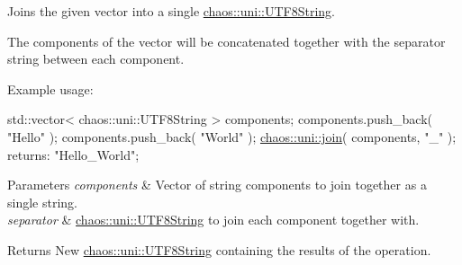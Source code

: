 Joins the given vector into a single \hyperlink{classchaos_1_1uni_1_1_u_t_f8_string}{chaos\-::uni\-::\-U\-T\-F8\-String}. 

The components of the vector will be concatenated together with the separator string between each component.

Example usage\-:


\begin{DoxyCode}
std::vector< chaos::uni::UTF8String > components;
components.push\_back( \textcolor{stringliteral}{"Hello"} );
components.push\_back( \textcolor{stringliteral}{"World"} );
\hyperlink{namespacechaos_1_1uni_ad2a77983423c8b10e2b18cae6f35d329}{chaos::uni::join}( components, \textcolor{stringliteral}{"\_"} ); returns: \textcolor{stringliteral}{"Hello\_World"};
\end{DoxyCode}



\begin{DoxyParams}{Parameters}
{\em components} & Vector of string components to join together as a single string. \\
\hline
{\em separator} & \hyperlink{classchaos_1_1uni_1_1_u_t_f8_string}{chaos\-::uni\-::\-U\-T\-F8\-String} to join each component together with. \\
\hline
\end{DoxyParams}
\begin{DoxyReturn}{Returns}
New \hyperlink{classchaos_1_1uni_1_1_u_t_f8_string}{chaos\-::uni\-::\-U\-T\-F8\-String} containing the results of the operation. 
\end{DoxyReturn}
